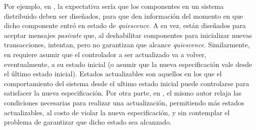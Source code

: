 Por ejemplo, en \cite{60317}, la expectativa sería que los componentes en un sistema distribuido deben ser diseñados, para que
den información del momento en que dicho componente entró en estado de \emph{quiescence}. A su vez, están diseñados para aceptar mensajes
\emph{pasivate} que, al deshabilitar componentes para inicializar nuevas transacciones, intentan, pero no garantizan
que alcance \emph{quiescence}. Similarmente, en \cite{6224401} requiere asumir que el controlador a ser actualizado va a
volver, eventualmente, a su estado inicial (o asumir que la nueva especificación vale desde el último estado inicial). Estados
actualizables son aquellos en los que el comportamiento del sistema desde el ultimo estado inicial puede controlarse
para satisfacer la nueva especificación.  Por otra parte, en \cite{PanzicaLaManna:2013:FCC:2487336.2487349}, el mismo
autor relaja las condiciones necesarias para realizar una actualización, permitiendo más estados actualizables, al
costo de violar la nueva especificación, y sin contemplar el problema de garantizar que dicho estado sea alcanzado.




